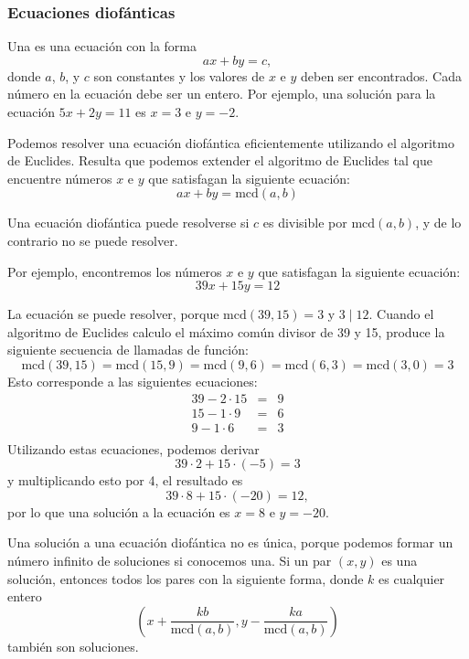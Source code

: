 \subsubsection*{Ecuaciones diofánticas}


Una  es una ecuación con la forma \[ ax + by = c, \]
donde $a$, $b$, y $c$ son constantes y los valores de $x$ e $y$ deben ser
encontrados. Cada número en la ecuación debe ser un entero. Por ejemplo, una
solución para la ecuación $5x+2y=11$ es $x=3$ e $y=-2$.


Podemos resolver una ecuación diofántica eficientemente utilizando el
algoritmo de Euclides. Resulta que podemos extender el algoritmo de
Euclides tal que encuentre números $x$ e $y$ que satisfagan la siguiente
ecuación: \[ax + by = \textrm{mcd}(a,b)\]

Una ecuación diofántica puede resolverse si $c$ es divisible por
$\textrm{mcd}(a,b)$, y de lo contrario no se puede resolver.

Por ejemplo, encontremos los números $x$ e $y$ que satisfagan la siguiente
ecuación: \[39x + 15y = 12\]

La ecuación se puede resolver, porque $\textrm{mcd}(39,15)=3$ y $3 \mid 12$.
Cuando el algoritmo de Euclides calculo el máximo común divisor de 39 y 15,
produce la siguiente secuencia de llamadas de función:
\[
    \textrm{mcd}(39,15) = \textrm{mcd}(15,9)
    = \textrm{mcd}(9,6) = \textrm{mcd}(6,3)
    = \textrm{mcd}(3,0) = 3 \]
Esto corresponde a las siguientes ecuaciones:
\[
    \begin{array}{lcl}
        39 - 2 \cdot 15 & = & 9 \\
        15 - 1 \cdot 9  & = & 6 \\
        9 - 1 \cdot 6   & = & 3 \\
    \end{array}
\]
Utilizando estas ecuaciones, podemos derivar
\[
    39 \cdot 2 + 15 \cdot (-5) = 3
\]
y multiplicando esto por 4, el resultado es
\[
    39 \cdot 8 + 15 \cdot (-20) = 12,
\]
por lo que una solución a la ecuación es $x=8$ e $y=-20$.

Una solución a una ecuación diofántica no es única, porque podemos formar un
número infinito de soluciones si conocemos una. Si un par $(x,y)$ es una
solución, entonces todos los pares con la siguiente forma, donde $k$ es cualquier entero
\[\left(x+\frac{kb}{\textrm{mcd}(a,b)},y-\frac{ka}{\textrm{mcd}(a,b)}\right)\]
también son soluciones.

